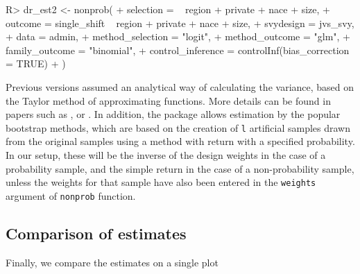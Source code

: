 \documentclass[
]{jss}
\begin{document}
\begin{CodeChunk}
\begin{CodeInput}
R> dr_est2 <- nonprob(
+   selection = ~ region + private + nace + size,
+   outcome = single_shift ~ region + private + nace + size,
+   svydesign = jvs_svy,
+   data = admin,
+   method_selection = "logit",
+   method_outcome = "glm",
+   family_outcome = "binomial",
+   control_inference = controlInf(bias_correction = TRUE)
+ )
\end{CodeInput}
\end{CodeChunk}

Previous versions assumed an analytical way of calculating the variance,
based on the Taylor method of approximating functions. More details can
be found in papers such as \cite{chen2020doubly},
\cite{yang_asymptotic_2020} or \cite{yang2021integration}. In addition,
the package allows estimation by the popular bootstrap methods, which
are based on the creation of \texttt{l} artificial samples drawn from
the original samples using a method with return with a specified
probability. In our setup, these will be the inverse of the design
weights in the case of a probability sample, and the simple return in
the case of a non-probability sample, unless the weights for that sample
have also been entered in the \texttt{weights} argument of
\texttt{nonprob} function.

\subsection{Comparison of estimates}\label{comparison-of-estimates}

Finally, we compare the estimates on a single plot
\end{document}
